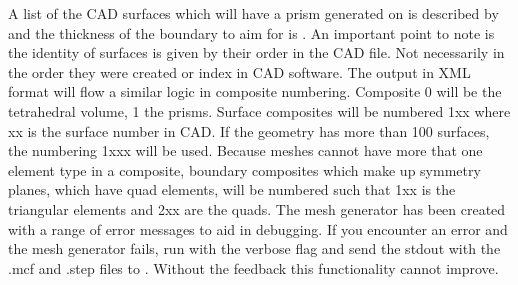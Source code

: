A list of the CAD surfaces which will have a prism generated on is described by
 and the thickness of the boundary to aim for is .
%
An important point to note is the identity of surfaces is given by their order
in the CAD file. Not necessarily in the order they were created or index in
CAD software. The output in XML format will flow a similar logic in composite
numbering. Composite 0 will be the tetrahedral volume, 1 the prisms. Surface
composites will be numbered 1xx where xx is the surface number in CAD. If
the geometry has more than 100 surfaces, the numbering 1xxx will be used.
Because \nekpp meshes cannot have more that one element type in a composite,
boundary composites which make up symmetry planes, which have quad elements,
will be numbered such that 1xx is the triangular elements and 2xx are the quads.
%
The mesh generator has been created with a range of error messages to aid in
debugging. If you encounter an error and the mesh generator fails, run \mc with
the verbose  flag and send the stdout with the .mcf and .step files
to . Without the feedback this functionality
cannot improve.


